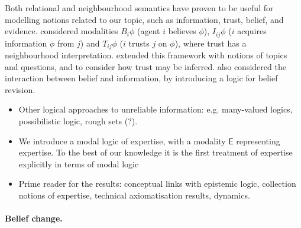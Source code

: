 Both relational and neighbourhood semantics have proven to be useful for
modelling notions related to our topic, such as information, trust, belief, and
evidence.
%
\textcite{Liau_2003} considered modalities $B_i\phi$ (agent $i$ believes
$\phi$), $I_{ij}\phi$ ($i$ acquires information $\phi$ from $j$) and
$T_{ij}\phi$ ($i$ trusts $j$ on $\phi$), where trust has a neighbourhood
interpretation. \textcite{dastani2004inferring} extended this framework with
notions of topics and questions, and to consider how trust may be inferred.
\textcite{bonanno2005simple} also considered the interaction between belief and
information, by introducing a logic for belief revision. 

\begin{notes}
    \begin{itemize}
        \item Other logical approaches to unreliable information: e.g.
              many-valued logics, possibilistic logic, rough sets (?).
        \item We introduce a modal logic of expertise, with a modality
              $\mathsf{E}$ representing expertise. To the best of our knowledge
              it is the first treatment of expertise explicitly in terms of
              modal logic
        \item Prime reader for the results: conceptual links with epistemic
              logic, collection notions of expertise, technical axiomatisation
              results, dynamics.
    \end{itemize}
\end{notes}


\paragraph{Belief change.}

